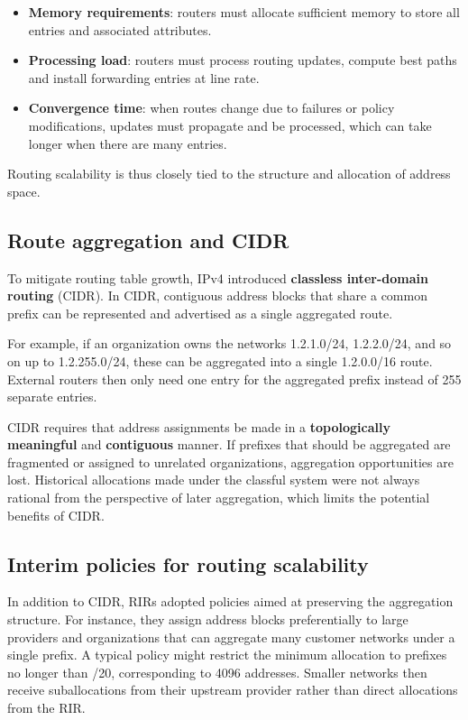 \documentclass[11pt,a4paper,openany]{report}
\begin{document}
\begin{itemize}
\item \textbf{Memory requirements}: routers must allocate sufficient memory to store all entries and associated attributes.
\item \textbf{Processing load}: routers must process routing updates, compute best paths and install forwarding entries at line rate.
\item \textbf{Convergence time}: when routes change due to failures or policy modifications, updates must propagate and be processed, which can take longer when there are many entries.
\end{itemize}

Routing scalability is thus closely tied to the structure and allocation of address space.

\subsection{Route aggregation and CIDR}

To mitigate routing table growth, IPv4 introduced \textbf{classless inter-domain routing} (CIDR). In CIDR, contiguous address blocks that share a common prefix can be represented and advertised as a single aggregated route.

For example, if an organization owns the networks 1.2.1.0/24, 1.2.2.0/24, and so on up to 1.2.255.0/24, these can be aggregated into a single 1.2.0.0/16 route. External routers then only need one entry for the aggregated prefix instead of 255 separate entries.

CIDR requires that address assignments be made in a \textbf{topologically meaningful} and \textbf{contiguous} manner. If prefixes that should be aggregated are fragmented or assigned to unrelated organizations, aggregation opportunities are lost. Historical allocations made under the classful system were not always rational from the perspective of later aggregation, which limits the potential benefits of CIDR.

\subsection{Interim policies for routing scalability}

In addition to CIDR, RIRs adopted policies aimed at preserving the aggregation structure. For instance, they assign address blocks preferentially to large providers and organizations that can aggregate many customer networks under a single prefix. A typical policy might restrict the minimum allocation to prefixes no longer than /20, corresponding to 4096 addresses. Smaller networks then receive suballocations from their upstream provider rather than direct allocations from the RIR.
\end{document}
